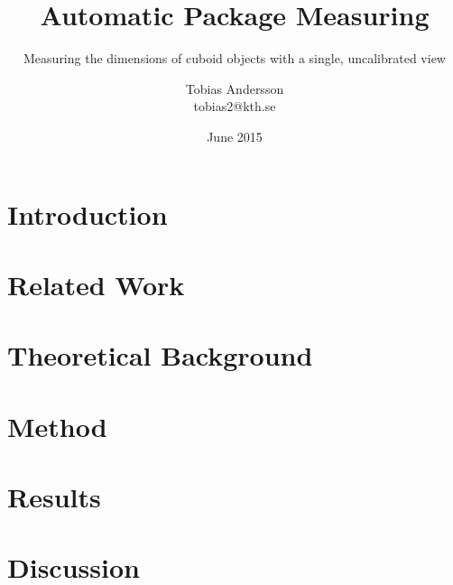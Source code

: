 \documentclass[a4paper,11pt]{kth-mag}
\title{Automatic Package Measuring}
\subtitle{Measuring the dimensions of cuboid objects with a single, uncalibrated view}
\author{Tobias Andersson\\\MakeLowercase{tobias2@kth.se}}
\date{June 2015}
\begin{document}
\frontmatter
\pagestyle{empty}
\removepagenumbers
\maketitle
{}




\clearpage



\clearpage
\tableofcontents*
\mainmatter


\pagestyle{newchap}

\chapter{Introduction}


\chapter{Related Work}


\chapter{Theoretical Background}


\chapter{Method}


\chapter{Results}


\chapter{Discussion}

\end{document}
